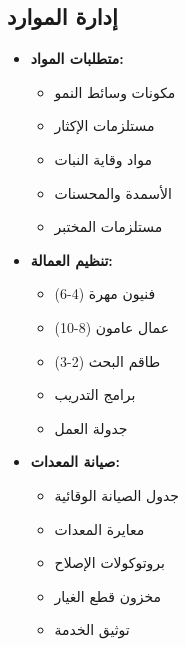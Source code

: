 \subsection{إدارة الموارد}
\begin{itemize}
    \item \textbf{متطلبات المواد:}
    \begin{itemize}
        \item مكونات وسائط النمو
        \item مستلزمات الإكثار
        \item مواد وقاية النبات
        \item الأسمدة والمحسنات
        \item مستلزمات المختبر
    \end{itemize}
    
    \item \textbf{تنظيم العمالة:}
    \begin{itemize}
        \item فنيون مهرة (4-6)
        \item عمال عامون (8-10)
        \item طاقم البحث (2-3)
        \item برامج التدريب
        \item جدولة العمل
    \end{itemize}
    
    \item \textbf{صيانة المعدات:}
    \begin{itemize}
        \item جدول الصيانة الوقائية
        \item معايرة المعدات
        \item بروتوكولات الإصلاح
        \item مخزون قطع الغيار
        \item توثيق الخدمة
    \end{itemize}
\end{itemize}

